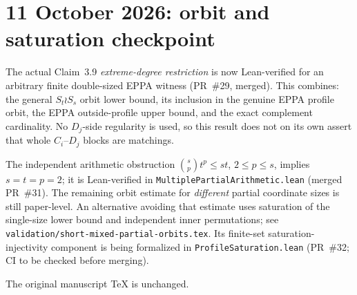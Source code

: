 \documentclass[11pt,a4paper]{article}
\begin{document}
\section*{11 October 2026: orbit and saturation checkpoint}
The actual Claim~3.9 \emph{extreme-degree restriction} is now
Lean-verified for an arbitrary finite double-sized EPPA witness
(PR~\#29, merged). This combines:
the general \(S_t\wr S_s\) orbit lower bound, its inclusion in the
genuine EPPA profile orbit, the EPPA outside-profile upper bound,
and the exact complement cardinality.
No \(D_j\)-side regularity is used, so this result does not on its
own assert that whole \(C_i\)--\(D_j\) blocks are matchings.

The independent arithmetic obstruction
\(\binom{s}{p}t^p\le st\), \(2\le p\le s\),
implies \(s=t=p=2\); it is Lean-verified in
\texttt{MultiplePartialArithmetic.lean} (merged PR~\#31).
The remaining orbit estimate for \emph{different}
partial coordinate sizes is still paper-level.
An alternative avoiding that estimate uses saturation of the
single-size lower bound and independent inner permutations;
see \texttt{validation/short-mixed-partial-orbits.tex}.
Its finite-set saturation-injectivity component is being
formalized in \texttt{ProfileSaturation.lean} (PR~\#32;
CI to be checked before merging).

The original manuscript TeX is unchanged.
\end{document}
